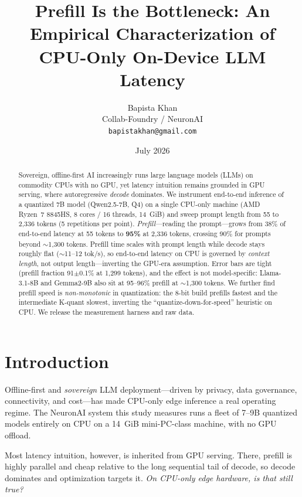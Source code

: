 \documentclass[10pt,twocolumn]{article}
\title{\textbf{Prefill Is the Bottleneck: An Empirical Characterization
of CPU-Only On-Device LLM Latency}}
\author{
  Bapista Khan\\
  Collab-Foundry / NeuronAI\\
  \texttt{bapistakhan@gmail.com}
}
\date{July 2026}
\begin{document}
\maketitle

\begin{abstract}
\noindent
Sovereign, offline-first AI increasingly runs large language models (LLMs)
on commodity CPUs with no GPU, yet latency intuition remains grounded in
GPU serving, where autoregressive \emph{decode} dominates. We instrument
end-to-end inference of a quantized 7B model (Qwen2.5-7B, Q4) on a single
CPU-only machine (AMD Ryzen~7 8845HS, 8 cores / 16 threads, 14~GiB) and
sweep prompt length from 55 to 2{,}336 tokens (5 repetitions per point).
\emph{Prefill}---reading the prompt---grows from 38\% of end-to-end latency
at 55 tokens to \textbf{95\%} at 2{,}336 tokens, crossing 90\% for prompts
beyond $\sim$1{,}300 tokens. Prefill time scales with prompt length while
decode stays roughly flat ($\sim$11--12 tok/s), so end-to-end latency on
CPU is governed by \emph{context length}, not output length---inverting the
GPU-era assumption. Error bars are tight (prefill fraction 91$\pm$0.1\% at
1{,}299 tokens), and the effect is not model-specific: Llama-3.1-8B and
Gemma2-9B also sit at 95--96\% prefill at $\sim$1{,}300 tokens. We further
find prefill speed is \emph{non-monotonic} in quantization: the 8-bit build
prefills fastest and the intermediate K-quant slowest, inverting the
``quantize-down-for-speed'' heuristic on CPU. We release the measurement
harness and raw data.
\end{abstract}

\section{Introduction}
\label{sec:intro}

Offline-first and \emph{sovereign} LLM deployment---driven by privacy,
data governance, connectivity, and cost---has made CPU-only edge inference
a real operating regime. The NeuronAI system this study measures runs a
fleet of 7--9B quantized models entirely on CPU on a 14~GiB mini-PC-class
machine, with no GPU offload.

Most latency intuition, however, is inherited from GPU serving. There,
prefill is highly parallel and cheap relative to the long sequential tail
of decode, so decode dominates and optimization targets it. \emph{On
CPU-only edge hardware, is that still true?}
\end{document}
